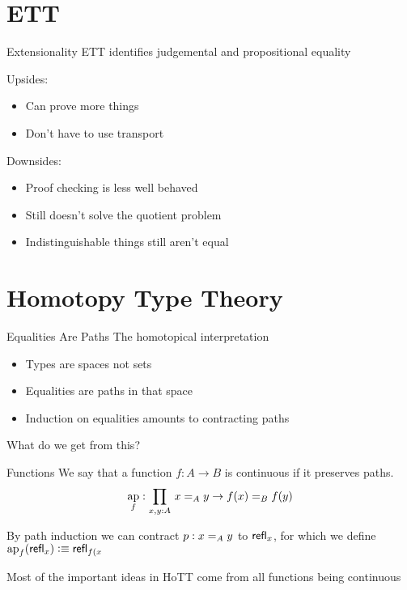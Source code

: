 \documentclass[xcolor=svgnames]{beamer}
\DeclareMathOperator{\ap}{ap}
\begin{document}
\section{ETT}

\begin{frame}{Extensionality}
  ETT identifies judgemental and propositional equality \pause

  Upsides:
  \begin{itemize}
  \item Can prove more things
  \item Don't have to use transport
  \end{itemize} \pause

  Downsides:
  \begin{itemize}
  \item Proof checking is less well behaved
  \item Still doesn't solve the quotient problem
  \item Indistinguishable things still aren't equal
  \end{itemize}
\end{frame}

\section{Homotopy Type Theory}

\begin{frame}{Equalities Are Paths}
  The homotopical interpretation
  \begin{itemize}
  \item Types are spaces not sets
  \item Equalities are paths in that space
  \item Induction on equalities amounts to contracting paths
  \end{itemize}

  What do we get from this? %
\end{frame}

\begin{frame}{Functions}
  We say that a function $f : A \to B$ is continuous if it preserves paths.
  $$ \ap_f : \prd{x,y:A} x =_A y \to f(x) =_B f(y) $$

  By path induction we can contract $p : \id[A]{x}{y}$ to $\refl{x}$, for which we define
  $\ap_f(\refl{x}) \defeq \refl{f(x}$ \pause

  Most of the important ideas in HoTT come from all functions being continuous
\end{frame}
\end{document}

